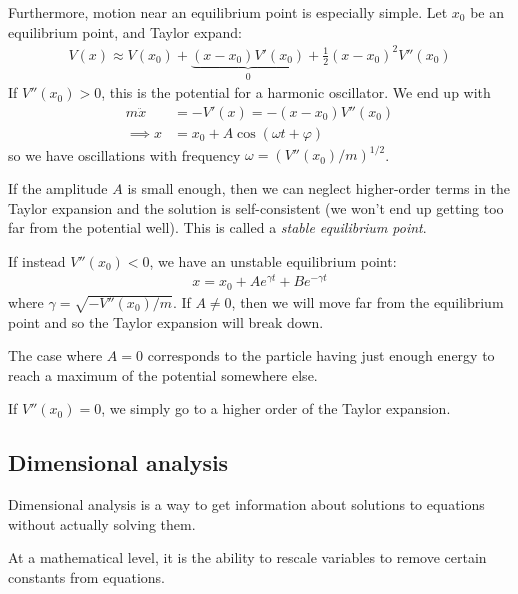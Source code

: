 \documentclass{../template/note}
\begin{document}
    Furthermore, motion near an equilibrium point is especially simple. Let \(x_0\) be an equilibrium point, and Taylor expand:
    \begin{align*}
        V(x) \approx V(x_0) + \underbrace{(x-x_0)V'(x_0)}_0 + \frac{1}{2}(x-x_0)^2 V''(x_0)
    \end{align*}
    If \(V''(x_0) > 0\), this is the potential for a harmonic oscillator. We end up with
    \begin{align*}
        m \ddot x &= -V'(x) = -(x-x_0)V''(x_0) \\
        \implies x &= x_0 + A \cos(\omega t + \varphi)
    \end{align*}
    so we have oscillations with frequency \(\omega = (V''(x_0)/m)^{1/2}\).

    If the amplitude \(A\) is small enough, then we can neglect higher-order terms in the Taylor expansion and the solution is self-consistent (we won't end up getting too far from the potential well). This is called a \emph{stable equilibrium point}.

    If instead \(V''(x_0) < 0\), we have an unstable equilibrium point:
    \begin{align*}
        x = x_0 + Ae^{\gamma t} + Be^{-\gamma t}
    \end{align*}
    where \(\gamma = \sqrt{-V''(x_0)/m}\). If \(A \neq 0\), then we will move far from the equilibrium point and so the Taylor expansion will break down.

    The case where \(A=0\) corresponds to the particle having just enough energy to reach a maximum of the potential somewhere else.

    If \(V''(x_0) = 0\), we simply go to a higher order of the Taylor expansion.
    
    \subsection{Dimensional analysis}

    Dimensional analysis is a way to get information about solutions to equations without actually solving them.

    At a mathematical level, it is the ability to rescale variables to remove certain constants from equations.
\end{document}
